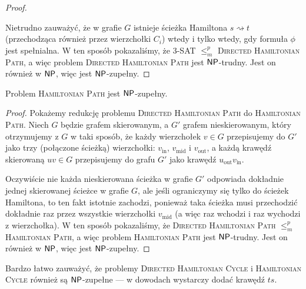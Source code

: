\begin{proof}
\begin{enumerate}
\begin{figure}[H]
        \end{figure}
    \end{enumerate}

    Nietrudno zauważyć, że w grafie $G$ istnieje ścieżka Hamiltona $s \rightsquigarrow t$ (przechodząca również przez wierzchołki $C_i$) wtedy i tylko wtedy, gdy formuła $\phi$ jest spełnialna. W ten sposób pokazaliśmy, że 3-SAT $\leq_m^p$ \textsc{Directed Hamiltonian Path}, a więc problem \textsc{Directed Hamiltonian Path} jest $\textsf{NP}$-trudny. Jest on również w $\textsf{NP}$, więc jest $\textsf{NP}$-zupełny.
\end{proof}

\begin{theorem}
    Problem \textsc{Hamiltonian Path} jest $\textsf{NP}$-zupełny.
\end{theorem}
\begin{proof}
    Pokażemy redukcję problemu \textsc{Directed Hamiltonian Path} do \textsc{Hamiltonian Path}. Niech $G$ będzie grafem skierowanym, a $G'$ grafem nieskierowanym, który otrzymujemy z $G$ w taki sposób, że każdy wierzchołek $v \in G$ przepisujemy do $G'$ jako trzy (połączone ścieżką) wierzchołki: $v_\text{in}$, $v_\text{mid}$ i $v_\text{out}$, a każdą krawędź skierowaną $uv \in G$ przepisujemy do grafu $G'$ jako krawędź $u_\text{out}v_\text{in}$.

    Oczywiście nie każda nieskierowana ścieżka w grafie $G'$ odpowiada dokładnie jednej skierowanej ścieżce w grafie $G$, ale jeśli ograniczymy się tylko do ścieżek Hamiltona, to ten fakt istotnie zachodzi, ponieważ taka ścieżka musi przechodzić dokładnie raz przez wszystkie wierzchołki $v_\text{mid}$ (a więc raz wchodzi i raz wychodzi z wierzchołka).
    W ten sposób pokazaliśmy, że \textsc{Directed Hamiltonian Path} $\leq_m^p$ \textsc{Hamiltonian Path}, a więc problem \textsc{Hamiltonian Path} jest $\textsf{NP}$-trudny. Jest on również w $\textsf{NP}$, więc jest $\textsf{NP}$-zupełny.
\end{proof}

Bardzo łatwo zauważyć, że problemy \textsc{Directed Hamiltonian Cycle} i \textsc{Hamiltonian Cycle} również są $\textsf{NP}$-zupełne --- w dowodach wystarczy dodać krawędź $ts$.

